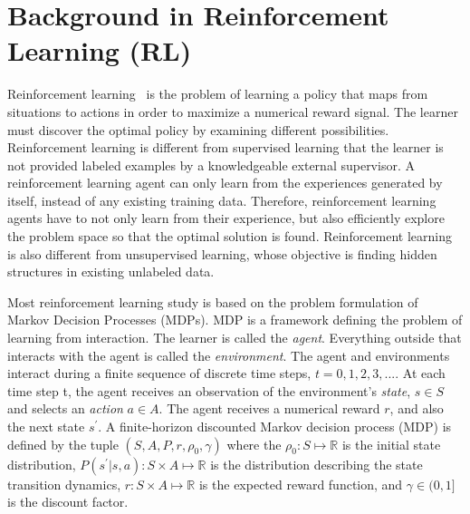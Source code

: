 \section{Background in Reinforcement Learning (RL)}
Reinforcement learning~\cite{sutton1998reinforcement} is the problem of learning a policy that maps from situations to actions in order to maximize a numerical reward signal. The learner must discover the optimal policy by examining different possibilities. Reinforcement learning is different from supervised learning that the learner is not provided labeled examples by a knowledgeable external supervisor. A reinforcement learning agent can only learn from the experiences generated by itself, instead of any existing training data. Therefore, reinforcement learning agents have to not only learn from their experience, but also efficiently explore the problem space so that the optimal solution is found.  Reinforcement learning is also different from unsupervised learning, whose objective is finding hidden structures in existing unlabeled data.

Most reinforcement learning study is based on the problem formulation of Markov Decision Processes (MDPs). MDP is a framework defining the problem of learning from interaction. The learner is called the \textit{agent}. Everything outside that interacts with the agent is called the \textit{environment}.
The agent and environments interact during a finite sequence of discrete time steps, $t=0,1,2,3,...$. At each time step t, the agent receives an observation of the environment's \textit{state}, $s \in S$ and selects an \textit{action} $a \in A$. The agent receives a numerical reward $r$, and also the next state $s^\prime$.  A finite-horizon discounted Markov decision process (MDP) is defined by the tuple $(S,A,P,r,\rho_0,\gamma) $ where the $\rho_0 : S \mapsto \mathbb{R}$ is the initial state distribution, $P(s^\prime|s,a) : S \times A \mapsto \mathbb{R}$ is the distribution describing the state transition dynamics, $r : S \times A \mapsto \mathbb{R}$ is the expected reward function, and $\gamma \in (0,1]$ is the discount factor.

